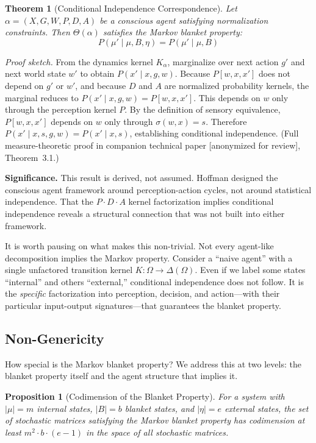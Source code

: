 \documentclass[11pt,a4paper]{article}
\theoremstyle{definition}
\theoremstyle{plain}
\newtheorem{theorem}[definition]{Theorem}
\newtheorem{proposition}[definition]{Proposition}
\theoremstyle{remark}
\begin{document}
\begin{theorem}[Conditional Independence Correspondence]\label{thm:main}
Let $\alpha = (X, G, W, P, D, A)$ be a conscious agent satisfying normalization constraints. Then $\Theta(\alpha)$ satisfies the Markov blanket property:
$$P(\mu' \mid \mu, B, \eta) = P(\mu' \mid \mu, B)$$
\end{theorem}

\textit{Proof sketch.} From the dynamics kernel $K_\alpha$, marginalize over next action $g'$ and next world state $w'$ to obtain $P(x' \mid x, g, w)$. Because $P[w, x, x']$ does not depend on $g'$ or $w'$, and because $D$ and $A$ are normalized probability kernels, the marginal reduces to $P(x' \mid x, g, w) = P[w, x, x']$. This depends on $w$ only through the perception kernel $P$. By the definition of sensory equivalence, $P[w, x, x']$ depends on $w$ only through $\sigma(w, x) = s$. Therefore $P(x' \mid x, s, g, w) = P(x' \mid x, s)$, establishing conditional independence. (Full measure-theoretic proof in companion technical paper [anonymized for review], Theorem~3.1.)

\textbf{Significance.} This result is derived, not assumed. Hoffman designed the conscious agent framework around perception-action cycles, not around statistical independence. That the $P \cdot D \cdot A$ kernel factorization implies conditional independence reveals a structural connection that was not built into either framework.

It is worth pausing on what makes this non-trivial. Not every agent-like decomposition implies the Markov property. Consider a ``naive agent'' with a single unfactored transition kernel $K: \Omega \to \Delta(\Omega)$. Even if we label some states ``internal'' and others ``external,'' conditional independence does not follow. It is the \textit{specific} factorization into perception, decision, and action---with their particular input-output signatures---that guarantees the blanket property.

\subsection{Non-Genericity}\label{sec:nongenericity}

How special is the Markov blanket property? We address this at two levels: the blanket property itself and the agent structure that implies it.

\begin{proposition}[Codimension of the Blanket Property]
For a system with $|\mu| = m$ internal states, $|B| = b$ blanket states, and $|\eta| = e$ external states, the set of stochastic matrices satisfying the Markov blanket property has codimension at least $m^2 \cdot b \cdot (e-1)$ in the space of all stochastic matrices.
\end{proposition}
\end{document}
